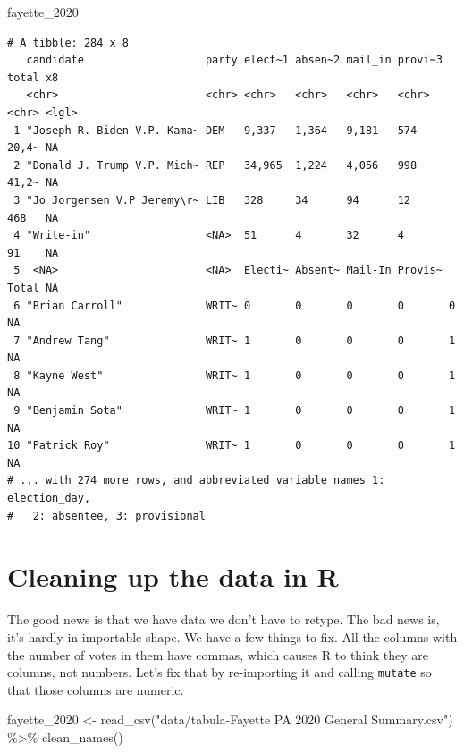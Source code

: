 \documentclass[
  letterpaper,
  DIV=11,
  numbers=noendperiod]{scrreprt}
\newenvironment{Shaded}{\begin{snugshade}}{\end{snugshade}}
\newcommand{\FunctionTok}[1]{\textcolor[rgb]{0.28,0.35,0.67}{#1}}
\newcommand{\NormalTok}[1]{\textcolor[rgb]{0.00,0.23,0.31}{#1}}
\newcommand{\OtherTok}[1]{\textcolor[rgb]{0.00,0.23,0.31}{#1}}
\newcommand{\SpecialCharTok}[1]{\textcolor[rgb]{0.37,0.37,0.37}{#1}}
\newcommand{\StringTok}[1]{\textcolor[rgb]{0.13,0.47,0.30}{#1}}
\begin{document}
\begin{Shaded}
\begin{Highlighting}[]
\NormalTok{fayette\_2020}
\end{Highlighting}
\end{Shaded}

\begin{verbatim}
# A tibble: 284 x 8
   candidate                   party elect~1 absen~2 mail_in provi~3 total x8   
   <chr>                       <chr> <chr>   <chr>   <chr>   <chr>   <chr> <lgl>
 1 "Joseph R. Biden V.P. Kama~ DEM   9,337   1,364   9,181   574     20,4~ NA   
 2 "Donald J. Trump V.P. Mich~ REP   34,965  1,224   4,056   998     41,2~ NA   
 3 "Jo Jorgensen V.P Jeremy\r~ LIB   328     34      94      12      468   NA   
 4 "Write-in"                  <NA>  51      4       32      4       91    NA   
 5  <NA>                       <NA>  Electi~ Absent~ Mail-In Provis~ Total NA   
 6 "Brian Carroll"             WRIT~ 0       0       0       0       0     NA   
 7 "Andrew Tang"               WRIT~ 1       0       0       0       1     NA   
 8 "Kayne West"                WRIT~ 1       0       0       0       1     NA   
 9 "Benjamin Sota"             WRIT~ 1       0       0       0       1     NA   
10 "Patrick Roy"               WRIT~ 1       0       0       0       1     NA   
# ... with 274 more rows, and abbreviated variable names 1: election_day,
#   2: absentee, 3: provisional
\end{verbatim}

\hypertarget{cleaning-up-the-data-in-r}{%
\section{Cleaning up the data in R}\label{cleaning-up-the-data-in-r}}

The good news is that we have data we don't have to retype. The bad news
is, it's hardly in importable shape. We have a few things to fix. All
the columns with the number of votes in them have commas, which causes R
to think they are columns, not numbers. Let's fix that by re-importing
it and calling \texttt{mutate} so that those columns are numeric.

\begin{Shaded}
\begin{Highlighting}[]
\NormalTok{fayette\_2020 }\OtherTok{\textless{}{-}} \FunctionTok{read\_csv}\NormalTok{(}\StringTok{"data/tabula{-}Fayette PA 2020 General Summary.csv"}\NormalTok{) }\SpecialCharTok{\%\textgreater{}\%} \FunctionTok{clean\_names}\NormalTok{()}
\end{Highlighting}
\end{Shaded}
\end{document}
